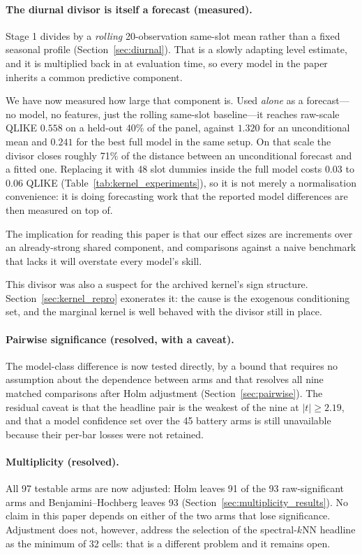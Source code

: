 \paragraph{The diurnal divisor is itself a forecast (measured).} Stage 1
divides by a \emph{rolling} 20-observation same-slot mean rather than a fixed
seasonal profile (Section~\ref{sec:diurnal}). That is a slowly adapting level
estimate, and it is multiplied back in at evaluation time, so every model in
the paper inherits a common predictive component.

We have now measured how large that component is. Used \emph{alone} as a
forecast---no model, no features, just the rolling same-slot baseline---it
reaches raw-scale QLIKE $0.558$ on a held-out 40\% of the panel, against
$1.320$ for an unconditional mean and $0.241$ for the best full model in the
same setup. On that scale the divisor closes roughly 71\% of the distance
between an unconditional forecast and a fitted one. Replacing it with 48 slot
dummies inside the full model costs $0.03$ to $0.06$ QLIKE
(Table~\ref{tab:kernel_experiments}), so it is not merely a normalisation
convenience: it is doing forecasting work that the reported model differences
are then measured on top of.

The implication for reading this paper is that our effect sizes are increments
over an already-strong shared component, and comparisons against a naive
benchmark that lacks it will overstate every model's skill.

This divisor was also a suspect for the archived kernel's sign structure.
Section~\ref{sec:kernel_repro} exonerates it: the cause is the exogenous
conditioning set, and the marginal kernel is well behaved with the divisor
still in place.

\paragraph{Pairwise significance (resolved, with a caveat).} The model-class
difference is now tested directly, by a bound that requires no assumption about
the dependence between arms and that resolves all nine matched comparisons
after Holm adjustment (Section~\ref{sec:pairwise}). The residual caveat is that
the headline pair is the weakest of the nine at $|t| \ge 2.19$, and that a
model confidence set over the 45 battery arms is still unavailable because
their per-bar losses were not retained.

\paragraph{Multiplicity (resolved).} All 97 testable arms are now adjusted:
Holm leaves 91 of the 93 raw-significant arms and Benjamini--Hochberg leaves 93
(Section~\ref{sec:multiplicity_results}). No claim in this paper depends on
either of the two arms that lose significance. Adjustment does not, however,
address the selection of the spectral-$k$NN headline as the minimum of 32
cells: that is a different problem and it remains open.

